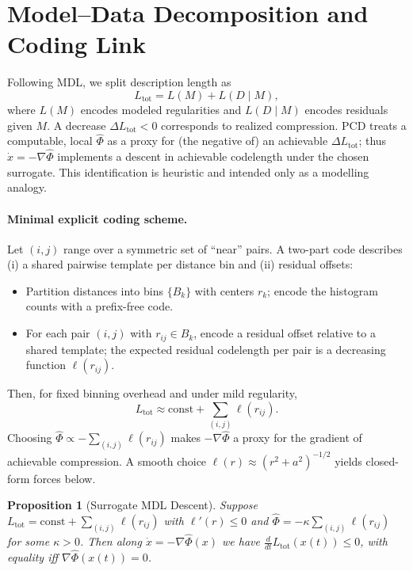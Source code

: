\documentclass[11pt,a4paper]{article}
\numberwithin{equation}{section}
\newtheorem{proposition}{Proposition}[section]
\begin{document}
\section{Model--Data Decomposition and Coding Link}
Following MDL, we split description length as
\begin{equation}
\label{eq:Ltot}
L_{\text{tot}} = L(M) + L(D\mid M),
\end{equation}
where $L(M)$ encodes modeled regularities and $L(D\mid M)$ encodes residuals given $M$. A decrease $\Delta L_{\text{tot}}<0$ corresponds to realized compression. PCD treats a computable, local $\widehat{\Phi}$ as a proxy for (the negative of) an achievable $\Delta L_{\text{tot}}$; thus $\dot x=-\nabla\widehat{\Phi}$ implements a descent in achievable codelength under the chosen surrogate. 
This identification is heuristic and intended only as a modelling analogy.

\paragraph{Minimal explicit coding scheme.}
Let $(i,j)$ range over a symmetric set of ``near'' pairs. A two-part code describes (i) a shared pairwise template per distance bin and (ii) residual offsets:
\begin{itemize}
\item Partition distances into bins $\{B_k\}$ with centers $r_k$; encode the histogram counts with a prefix-free code.
\item For each pair $(i,j)$ with $r_{ij}\in B_k$, encode a residual offset relative to a shared template; the expected residual codelength per pair is a decreasing function $\ell(r_{ij})$.
\end{itemize}
Then, for fixed binning overhead and under mild regularity,
\begin{equation}
\label{eq:Ltotsum}
L_{\text{tot}} \approx \text{const} + \sum_{(i,j)} \ell(r_{ij}).
\end{equation}
Choosing $\widehat{\Phi}\propto -\sum_{(i,j)} \ell(r_{ij})$ makes $-\nabla\widehat{\Phi}$ a proxy for the gradient of achievable compression. A smooth choice $\ell(r)\approx (r^2+a^2)^{-1/2}$ yields closed-form forces below.

\begin{proposition}[Surrogate MDL Descent]
\label{prop:mdl-descent}
Suppose $L_{\text{tot}}=\mathrm{const}+\sum_{(i,j)}\ell(r_{ij})$ with $\ell'(r)\le 0$ and 
$\widehat{\Phi}=-\kappa\sum_{(i,j)}\ell(r_{ij})$ for some $\kappa>0$. 
Then along $\dot x=-\nabla\widehat{\Phi}(x)$ we have $\frac{d}{dt}L_{\text{tot}}(x(t))\le 0$,
with equality iff $\nabla\widehat{\Phi}(x(t))=0$.
\end{proposition}
\end{document}
